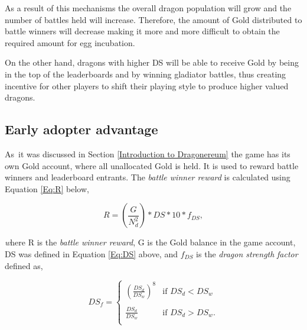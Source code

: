 \documentclass[12pt]{article}
\begin{document}
{As a result of this mechanisms the overall dragon population will grow and the number of battles held will increase. Therefore, the amount of Gold distributed to battle winners will decrease making it more and more difficult to obtain the required amount for egg incubation.\par

On the other hand, dragons with higher DS\textit{ }will be able to receive Gold by being in the top of the leaderboards and by winning gladiator battles, thus creating incentive for other players to shift their playing style to produce higher valued dragons.\par

\subsection{Early adopter advantage}
\label{Early adopter advantage} \par

As\ it was discussed in  Section \ref{Introduction to Dragonereum}  the game has its own Gold account, where all unallocated Gold is held. It is used to reward battle winners and leaderboard entrants. The \textit{battle winner reward} is calculated using   Equation \ref{Eq:R}  below,\par


\begin{center}
  \begin{equation}\label{Eq:R}
    R=\left(\frac{G}{N_d^2}\right)*DS*10*f_{DS},
  \end{equation}
\end{center}

\vspace{\baselineskip}
\textit{w}here R is the \textit{battle winner reward}, G is the Gold balance in the game account, DS was defined in Equation \ref{Eq:DS} above, and $f_{DS}$ is the \textit{dragon strength} \textit{factor} defined as,\par


\begin{center}
  \begin{equation}
   DS_f=\begin{cases}
     \left(\frac{DS_{d}}{DS_{w}}\right)^8 & \mbox{if }  DS_{d} < DS_{w}\\
     \\
     \frac{DS_{d}}{DS_{w}} & \mbox{if } DS_{d}>DS_{w}.\\
    \end{cases}
  \end{equation}
\end{center}

}
\end{document}
